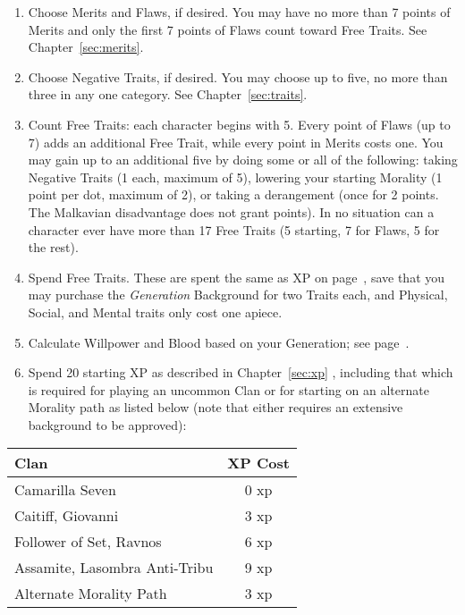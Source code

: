 \begin{enumerate}
	\item Choose Merits and Flaws, if desired.  You may have no more than 7 points of Merits 
	and only the first 7 points of Flaws count toward Free Traits.  See Chapter~\ref{sec:merits}.
	\item Choose Negative Traits, if desired.  You may choose up to five, no more than 
	three in any one category.  See Chapter~\ref{sec:traits}.
	\item Count Free Traits:  each character begins with 5.  Every point of Flaws (up to 7) adds 
	an additional Free Trait, while every point in Merits costs one.  You may gain up to an 
	additional five by doing some or all of the following:  taking Negative Traits (1 each, maximum 
	of 5), lowering your starting Morality (1 point per dot, maximum of 2), or taking a derangement 
	(once for 2 points.  The Malkavian disadvantage does not grant points).  In no situation can 
	a character ever have more than 17 Free Traits (5 starting, 7 for Flaws, 5 for the rest).
	\item Spend Free Traits. These are spent the same as XP on page~\pageref{sec:xp}, save 
	that you may purchase the \emph{Generation} Background for two Traits each, and Physical, Social, 
	and Mental traits only cost one apiece.
	\item Calculate Willpower and Blood based on your Generation; see page~\pageref{bg:generation}.
	\item Spend 20 starting XP as described in Chapter~\ref{sec:xp} , including that which is 
	required for playing an uncommon Clan or for starting on an alternate Morality path as 
	listed below (note that either requires an extensive background to be approved):
\end{enumerate}

\begin{center}
\begin{tabular}{ | l c | }
	\hline
	\textbf{Clan} & \textbf{XP Cost} \\
	\hline
	Camarilla Seven & 0 xp \\
	Caitiff, Giovanni & 3 xp \\
	Follower of Set, Ravnos & 6 xp \\
	Assamite, Lasombra Anti-Tribu & 9 xp \\ \cline{2-2}
	\hline
	Alternate Morality Path & 3 xp \\
	\hline
\end{tabular}
\end{center}


